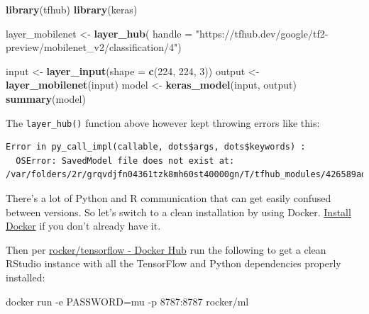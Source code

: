 \documentclass[]{book}
\newenvironment{Shaded}{\begin{snugshade}}{\end{snugshade}}
\newcommand{\DataTypeTok}[1]{\textcolor[rgb]{0.13,0.29,0.53}{#1}}
\newcommand{\DecValTok}[1]{\textcolor[rgb]{0.00,0.00,0.81}{#1}}
\newcommand{\ExtensionTok}[1]{#1}
\newcommand{\KeywordTok}[1]{\textcolor[rgb]{0.13,0.29,0.53}{\textbf{#1}}}
\newcommand{\NormalTok}[1]{#1}
\newcommand{\StringTok}[1]{\textcolor[rgb]{0.31,0.60,0.02}{#1}}
\begin{document}
\begin{Shaded}
\begin{Highlighting}[]
\KeywordTok{library}\NormalTok{(tfhub)}
\KeywordTok{library}\NormalTok{(keras)}

\NormalTok{layer_mobilenet <-}\StringTok{ }\KeywordTok{layer_hub}\NormalTok{(}
  \DataTypeTok{handle =} \StringTok{"https://tfhub.dev/google/tf2-preview/mobilenet_v2/classification/4"}\NormalTok{)}

\NormalTok{input  <-}\StringTok{ }\KeywordTok{layer_input}\NormalTok{(}\DataTypeTok{shape =} \KeywordTok{c}\NormalTok{(}\DecValTok{224}\NormalTok{, }\DecValTok{224}\NormalTok{, }\DecValTok{3}\NormalTok{))}
\NormalTok{output <-}\StringTok{ }\KeywordTok{layer_mobilenet}\NormalTok{(input)}
\NormalTok{model  <-}\StringTok{ }\KeywordTok{keras_model}\NormalTok{(input, output)}
\KeywordTok{summary}\NormalTok{(model)}
\end{Highlighting}
\end{Shaded}

The \texttt{layer\_hub()} function above however kept throwing errors like this:

\begin{verbatim}
Error in py_call_impl(callable, dots$args, dots$keywords) : 
  OSError: SavedModel file does not exist at: /var/folders/2r/grqvdjfn04361tzk8mh60st40000gn/T/tfhub_modules/426589ad685896ab7954855255a52db3442cb38d/{saved_model.pbtxt|saved_model.pb}
\end{verbatim}

There's a lot of Python and R communication that can get easily confused between versions. So let's switch to a clean installation by using Docker. \href{https://docs.docker.com/get-docker/}{Install Docker} if you don't already have it.

Then per \href{https://hub.docker.com/r/rocker/tensorflow}{rocker/tensorflow - Docker Hub} run the following to get a clean RStudio instance with all the TensorFlow and Python dependencies properly installed:

\begin{Shaded}
\begin{Highlighting}[]
\ExtensionTok{docker}\NormalTok{ run -e PASSWORD=mu -p 8787:8787 rocker/ml}
\end{Highlighting}
\end{Shaded}
\end{document}
